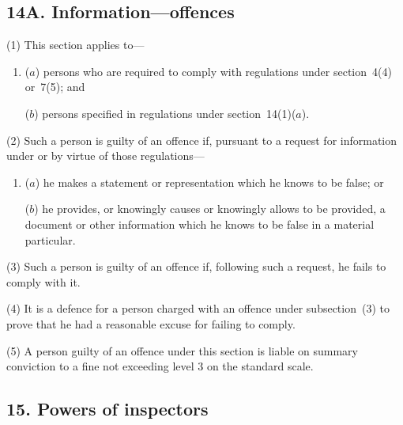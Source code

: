 \documentclass[12pt,a4paper]{article}
\begin{document}
\subsection{14A. Information—offences}

(1) This section applies to—
\begin{enumerate}\item[]
($a$) persons who are required to comply with regulations under section~4(4)  or~7(5); and

($b$) persons specified in regulations under section~14(1)($a$).
\end{enumerate}

(2) Such a person is guilty of an offence if, pursuant to a request for information under or by virtue of those regulations—
\begin{enumerate}\item[]
($a$) he makes a statement or representation which he knows to be false; or

($b$) he provides, or knowingly causes or knowingly allows to be provided, a document or other information which he knows to be false in a material particular.
\end{enumerate}

(3) Such a person is guilty of an offence if, following such a request, he fails to comply with it.

(4) It is a defence for a person charged with an offence under subsection~(3)  to prove that he had a reasonable excuse for failing to comply.

(5) A person guilty of an offence under this section is liable on summary conviction to a fine not exceeding level 3 on the standard scale.


\subsection{15. Powers of inspectors}
\end{document}
